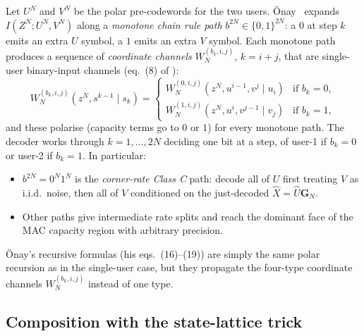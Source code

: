 \documentclass[11pt]{article}
\newcommand{\bbU}{U}
\newcommand{\bbX}{X}
\newcommand{\bbZ}{Z}
\newcommand{\bbV}{V}
\begin{document}
Let $\bbU^N$ and $\bbV^N$ be the polar pre-codewords for the two users.
\"{O}nay~\cite{Onay2013} expands $I(\bbZ^N;\bbU^N,\bbV^N)$ along a
\emph{monotone chain rule path} $b^{2N}\in\{0,1\}^{2N}$: a $0$ at step $k$
emits an extra $\bbU$ symbol, a $1$ emits an extra $\bbV$ symbol.  Each
monotone path produces a sequence of \emph{coordinate channels}
$W_N^{(b_k,i,j)}$, $k=i+j$, that are single-user binary-input channels
(eq.~(8) of \cite{Onay2013}):
\begin{equation}\label{eq:onay-coord}
  W_N^{(b_k,i,j)}(z^N, s^{k-1} \mid s_k)
  =\begin{cases}
     W_N^{(0,i,j)}(z^N, u^{i-1}, v^j \mid u_i) & \text{if } b_k=0,\\
     W_N^{(1,i,j)}(z^N, u^i, v^{j-1} \mid v_j) & \text{if } b_k=1,
   \end{cases}
\end{equation}
and these polarise (capacity terms go to $0$ or $1$) for every monotone
path. The decoder works through $k=1,\ldots,2N$ deciding one bit at a step,
of user-1 if $b_k=0$ or user-2 if $b_k=1$.  In particular:
\begin{itemize}
\item $b^{2N}=0^N 1^N$ is the \emph{corner-rate Class C} path:
      decode all of $\bbU$ first treating $\bbV$ as i.i.d.\ noise, then all
      of $\bbV$ conditioned on the just-decoded $\hat{\bbX} = \hat{\bbU}\mathbf{G}_N$.
\item Other paths give intermediate rate splits and reach the dominant face
      of the MAC capacity region with arbitrary precision.
\end{itemize}
\"{O}nay's recursive formulas (his eqs.~(16)--(19)) are simply the same polar
recursion as in the single-user case, but they propagate the four-type
coordinate channels $W_N^{(b_k,i,j)}$ instead of one type.

\subsection{Composition with the state-lattice trick}
\end{document}
